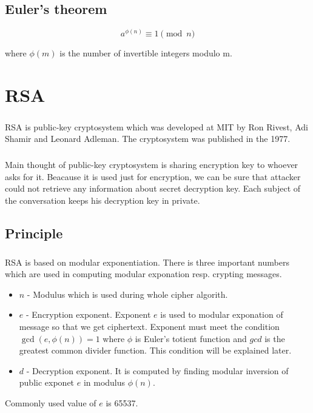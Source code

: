 \documentclass[thesis=B,english]{FITthesis}[2012/10/20]
\begin{document}
\section{Euler's theorem}

\[  a^{\phi(n)} \equiv 1 \pmod n\]
{
where \(\phi(m)\) is the number of invertible integers modulo m.

}






\chapter{RSA}

\paragraph*{}
{RSA is public-key cryptosystem which was developed at MIT by Ron Rivest, Adi Shamir and Leonard Adleman. The cryptosystem was published in the 1977.
}

\paragraph*{}{
Main thought of public-key cryptosystem is sharing encryption key to whoever asks for it. Beacause it is used just for encryption, we can be sure that attacker could not retrieve any information about secret decryption key. Each subject of the conversation keeps his decryption key in private.
}



\section{Principle}
\paragraph*{}
{RSA is based on modular exponentiation. There is three important numbers which are used in computing modular exponation resp. crypting messages.}
\begin{itemize}
 \item \(n\) - Modulus which is used during whole cipher algorith.
 \item \(e\) - Encryption exponent. Exponent \(e\) is used to modular exponation of message so that we get ciphertext. Exponent must meet the condition  \(\gcd(e,\phi(n)) = 1\) where \(\phi\) is Euler's totient function and \(gcd\) is the greatest common divider function. This condition will be explained later.
 \item \(d\) - Decryption exponent. It is computed by finding modular inversion of public exponet \(e\) in modulus \(\phi(n)\).
\end{itemize}
{Commonly used value of \(e\) is 65537.}
\end{document}
